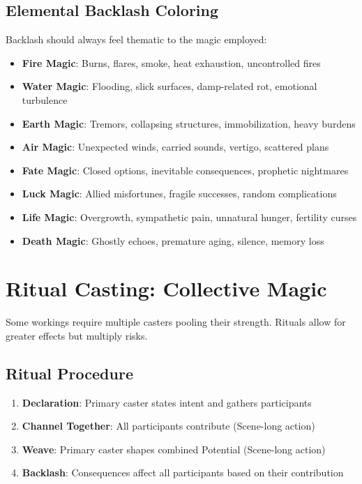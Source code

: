 \subsection*{Elemental Backlash Coloring}

Backlash should always feel thematic to the magic employed:

\begin{itemize}
    \item \textbf{Fire Magic}: Burns, flares, smoke, heat exhaustion, uncontrolled fires
    \item \textbf{Water Magic}: Flooding, slick surfaces, damp-related rot, emotional turbulence
    \item \textbf{Earth Magic}: Tremors, collapsing structures, immobilization, heavy burdens
    \item \textbf{Air Magic}: Unexpected winds, carried sounds, vertigo, scattered plans
    \item \textbf{Fate Magic}: Closed options, inevitable consequences, prophetic nightmares
    \item \textbf{Luck Magic}: Allied misfortunes, fragile successes, random complications
    \item \textbf{Life Magic}: Overgrowth, sympathetic pain, unnatural hunger, fertility curses
    \item \textbf{Death Magic}: Ghostly echoes, premature aging, silence, memory loss
\end{itemize}

\section*{Ritual Casting: Collective Magic}

Some workings require multiple casters pooling their strength. Rituals allow for greater effects but multiply risks.

\subsection*{Ritual Procedure}

\begin{enumerate}
    \item \textbf{Declaration}: Primary caster states intent and gathers participants
    \item \textbf{Channel Together}: All participants contribute (Scene-long action)
    \item \textbf{Weave}: Primary caster shapes combined Potential (Scene-long action)  
    \item \textbf{Backlash}: Consequences affect all participants based on their contribution
\end{enumerate}

